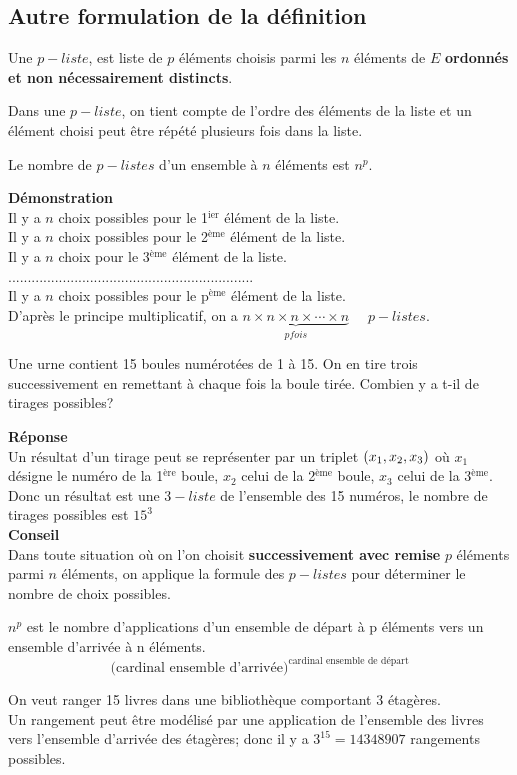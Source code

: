 \subsection*{Autre formulation de la définition}
Une $p-liste$, est liste  de $ p $ éléments choisis parmi les $ n $ éléments de $ E $ \textbf{ordonnés et non nécessairement distincts}.
\begin{remark}
Dans une $ p-liste $, on tient compte de l'ordre des éléments de la liste et un élément choisi peut être répété plusieurs fois dans la liste.
\end{remark}
\begin{theorem}
Le nombre de $ p-listes $ d'un ensemble à $ n $ éléments est $ n^{p}. $
\end{theorem}
\textbf{Démonstration}\\
Il y a $ n $ choix possibles pour  le 1$^{\text{ier}}$ élément de la liste.\\
Il y a $ n $ choix possibles pour  le 2$^{\text{ème}}$ élément de la liste.\\
Il y a $ n $ choix pour  le 3$^{\text{ème}}$ élément de la liste.\\
...............................................................\\
Il y a $ n $ choix possibles pour le p$^{\text{ème}}$ élément de la liste.\\
D'après le principe multiplicatif, on a $\underbrace{ n \times n \times n \times \cdots \times n }_{p fois}$  $\quad p-listes $.
\begin{exercice}
Une urne contient 15 boules numérotées de 1 à 15. On en tire trois successivement en remettant à chaque fois la boule tirée.  Combien y a t-il de tirages  possibles? 
\end{exercice}
\textbf{Réponse}\\
Un résultat d'un tirage peut se représenter par un triplet $ \left(x_{1}, x_{2},x_{3}\right) $  où $ x_{1} $ désigne le numéro de la 1$^{\text{ère}}$ boule, $ x_{2} $ celui de la 2$^{\text{ème}}$ boule, $ x_{3} $ celui de la 3$^{\text{ème}}$.\\
Donc un résultat est une $ 3-liste $ de l'ensemble des 15 numéros, le nombre de tirages possibles est $ 15^{3} $\\
\textbf{Conseil}\\
Dans toute situation où on l'on choisit \textbf{successivement avec remise} $ p $ éléments parmi $ n $ éléments, on applique la formule des $ p-listes $  pour déterminer le nombre de choix possibles.
\begin{remark}
$ n^{p} $ est le nombre d'applications d'un ensemble de départ à p éléments vers un ensemble d'arrivée à n éléments.
\[\textrm{(cardinal ensemble d'arrivée)}^{\textrm{cardinal ensemble de départ}} \]
\end{remark}
\begin{example}
On veut ranger 15 livres dans une bibliothèque comportant 3 étagères.\\
Un rangement peut être modélisé par  une application de l'ensemble des livres vers l'ensemble d'arrivée des étagères; donc il y a  $ 3^{15}=14 348 907 $ rangements possibles.
\end{example}


